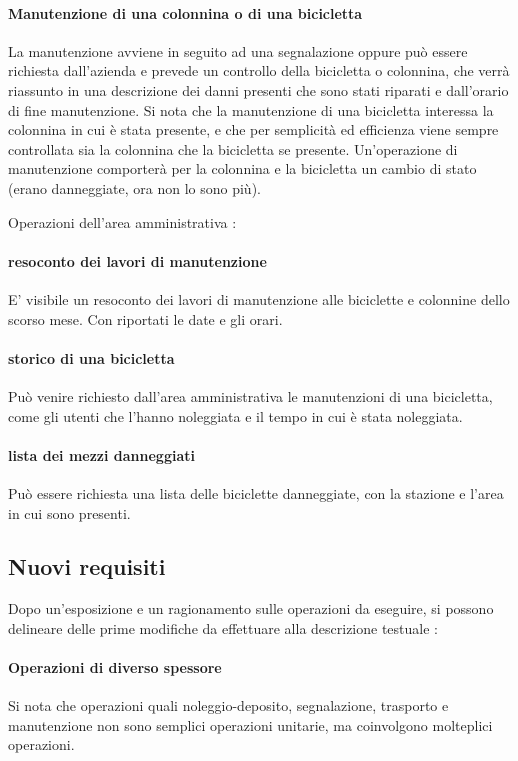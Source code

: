 \documentclass[a4paper,twoside]{article}
\begin{document}
\paragraph{Manutenzione di una colonnina o di una bicicletta} La manutenzione avviene in seguito ad una segnalazione oppure può essere richiesta dall'azienda e prevede un controllo della bicicletta o colonnina, che verrà riassunto in una descrizione dei danni presenti che sono stati riparati e dall'orario di fine manutenzione. Si nota che la manutenzione di una bicicletta interessa la colonnina in cui è stata presente, e che per semplicità ed efficienza viene sempre controllata sia la colonnina che la bicicletta se presente. Un'operazione di manutenzione comporterà per la colonnina e la bicicletta un cambio di stato (erano danneggiate, ora non lo sono più).
\par Operazioni dell'area amministrativa :
\paragraph{resoconto dei lavori di manutenzione} E' visibile un resoconto dei lavori di manutenzione alle biciclette e colonnine dello scorso mese. Con riportati le date e gli orari.
\paragraph{storico di una bicicletta} Può venire richiesto dall'area amministrativa le manutenzioni di una bicicletta, come gli utenti che l'hanno noleggiata e il tempo in cui è stata noleggiata.
\paragraph{lista dei mezzi danneggiati} Può essere richiesta una lista delle biciclette danneggiate, con la stazione e l'area in cui sono presenti.

\subsection{Nuovi requisiti}
Dopo un'esposizione e un ragionamento sulle operazioni da eseguire, si possono delineare delle prime modifiche da effettuare alla descrizione testuale :
\paragraph{Operazioni di diverso spessore} Si nota che operazioni quali noleggio-deposito, segnalazione, trasporto e manutenzione non sono semplici operazioni unitarie, ma coinvolgono molteplici operazioni.
\end{document}
